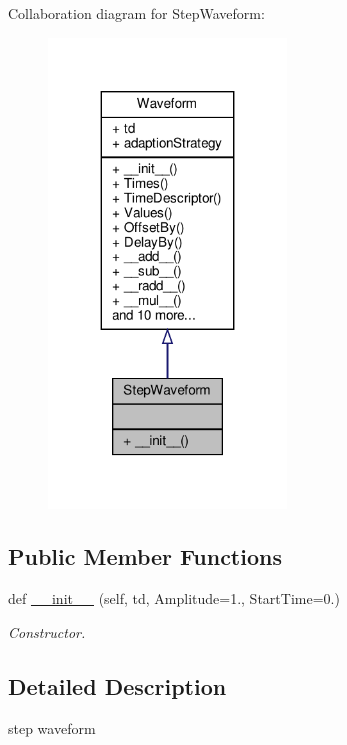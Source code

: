 Collaboration diagram for Step\+Waveform\+:\nopagebreak
\begin{figure}[H]
\begin{center}
\leavevmode
\includegraphics[width=179pt]{classSignalIntegrity_1_1TimeDomain_1_1Waveform_1_1StepWaveform_1_1StepWaveform__coll__graph}
\end{center}
\end{figure}
\subsection*{Public Member Functions}
\begin{DoxyCompactItemize}
\item 
def \hyperlink{classSignalIntegrity_1_1TimeDomain_1_1Waveform_1_1StepWaveform_1_1StepWaveform_abd2454a23c07e228bb0e4b5375d80320}{\+\_\+\+\_\+init\+\_\+\+\_\+} (self, td, Amplitude=1., Start\+Time=0.)
\begin{DoxyCompactList}\small\item\em Constructor. \end{DoxyCompactList}\end{DoxyCompactItemize}


\subsection{Detailed Description}
step waveform 

